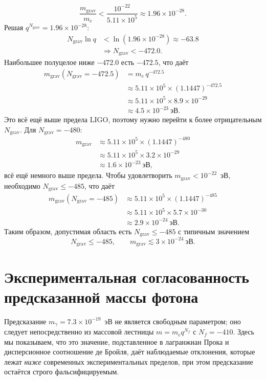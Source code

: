 \documentclass[11pt,a4paper]{article}
\begin{document}
	\[
	\frac{m_{\mathrm{grav}}}{m_e} < \frac{10^{-22}}{5.11\times10^5} \approx 1.96\times 10^{-28}.
	\]
	Решая $q^{N_{\mathrm{grav}}} = 1.96\times10^{-28}$:
	\[
	\begin{aligned}
		N_{\mathrm{grav}} \ln q &< \ln(1.96\times10^{-28}) \approx -63.8 \\
		&\Longrightarrow N_{\mathrm{grav}} < -472.0 .
	\end{aligned}
	\]
	Наибольшее полуцелое ниже $-472.0$ есть $-472.5$, что даёт
	\[
	\begin{aligned}
		m_{\mathrm{grav}}(N_{\mathrm{grav}} = -472.5) &= m_e \, q^{-472.5} \\
		&\approx 5.11\times10^5 \times (1.1447)^{-472.5} \\
		&\approx 5.11\times10^5 \times 8.9\times10^{-29} \\
		&\approx 4.5 \times 10^{-23}~\mathrm{эВ}.
	\end{aligned}
	\]
	Это всё ещё выше предела LIGO, поэтому нужно перейти к более отрицательным $N_{\mathrm{grav}}$.
	Для $N_{\mathrm{grav}} = -480$:
	\[
	\begin{aligned}
		m_{\mathrm{grav}} &\approx 5.11\times10^5 \times (1.1447)^{-480} \\
		&\approx 5.11\times10^5 \times 3.2\times10^{-29} \\
		&\approx 1.6 \times 10^{-23}~\mathrm{эВ},
	\end{aligned}
	\]
	всё ещё немного выше предела. Чтобы удовлетворить $m_{\mathrm{grav}} < 10^{-22}$~эВ,
	необходимо $N_{\mathrm{grav}} \le -485$, что даёт
	\[
	\begin{aligned}
		m_{\mathrm{grav}}(N_{\mathrm{grav}} = -485) &\approx 5.11\times10^5 \times (1.1447)^{-485} \\
		&\approx 5.11\times10^5 \times 5.7\times10^{-30} \\
		&\approx 2.9 \times 10^{-24}~\mathrm{эВ}.
	\end{aligned}
	\]
	Таким образом, допустимая область есть $N_{\mathrm{grav}} \le -485$ с типичным значением
	\[
	\boxed{N_{\mathrm{grav}} \le -485}, \qquad
	\boxed{m_{\mathrm{grav}} \lesssim 3 \times 10^{-24}~\mathrm{эВ}} .
	\]
	
	\clearpage
	\section{Экспериментальная согласованность предсказанной массы фотона}
	\label{sec:photon_consistency}
	
	Предсказание $m_\gamma = 7.3\times10^{-19}$~эВ не является свободным параметром; оно следует непосредственно из массовой лестницы $m = m_e q^{N_f}$ с $N_f = -410$. Здесь мы показываем, что это значение, подставленное в лагранжиан Прока и дисперсионное соотношение де Бройля, даёт наблюдаемые отклонения, которые лежат \emph{ниже} современных экспериментальных пределов, при этом предсказание остаётся строго фальсифицируемым.
	
\end{document}

